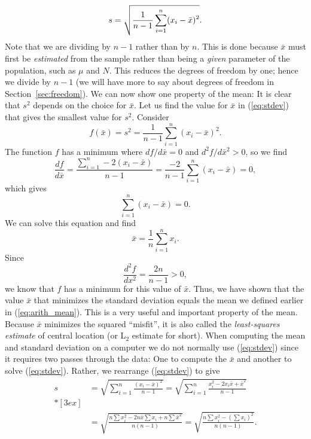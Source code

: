 \begin{equation}
	\index{Sample!variance}
s = \sqrt{ \frac{1}{n-1} \displaystyle \sum^n_{i=1} (x_i - \bar{x}) ^2}.
\label{eq:stdev}
\end{equation}
Note that we are dividing by $n - 1$ rather than by $n$.  This is done because $\bar{x}$  must first be \emph{estimated} from the 
sample rather than being a \emph{given} parameter of the population, such as $\mu$ and $N$.  This reduces the degrees 
of freedom by one; hence we divide by $n - 1$ (we will have more to say about degrees of freedom in Section~\ref{sec:freedom}).
	We can now show one property of the mean:  It is clear that $s^2$ depends on the choice for $\bar{x}$.  
Let us find the value for $\bar{x}$   in (\ref{eq:stdev}) that gives the smallest value for $s^2$.  Consider
\begin{equation}
f(\bar{x}) = s^2 = \frac{1}{n-1} \sum^n_{i=1} (x_i - \bar{x})^2.
\end{equation}
The function $f$ has a minimum where $df/d\bar{x}= 0$  and $d^2f/d\bar{x}^2 > 0$, so we find
\begin{equation}
\frac{df}{d\bar{x}} = \displaystyle \frac{\displaystyle  \sum ^n_{i=1} - 2 (x_i - \bar{x})} {n-1} =
\frac{-2}{n-1} \sum ^n _{i=1} (x_i - \bar{x}) =  0,
\end{equation}	 
which gives
\begin{equation}
\sum^n_{i=1} (x_i - \bar{x}) = 0.
\end{equation}	 
We can solve this equation and find
\begin{equation}
\bar{x} = \frac{1}{n} \sum^n _{i=1} x_i.
\end{equation}	 
Since
\begin{equation}
\frac{d^2f}{dx^2} = \frac{2n}{n-1} > 0,
\end{equation} 
we know that $f$ has a minimum for this value of $\bar{x}$.  Thus, we have shown that the value $\bar{x}$
that minimizes the standard deviation equals 
the mean we defined earlier in (\ref{eq:arith_mean}).  This is a very useful and important property of the mean. 
Because $\bar{x}$ 
minimizes the squared ``misfit'', it is also called the \emph{least-squares estimate} of central location 
(or L$_2$ estimate for short).  When computing the mean and standard deviation on a computer we 
do not normally use (\ref{eq:stdev}) since it requires two passes through the data: One to compute the $\bar{x}$ and 
another to solve (\ref{eq:stdev}).  Rather, we rearrange (\ref{eq:stdev}) to give
\begin{equation}
\begin{array}{ll}
s & = \displaystyle \sqrt{ \sum^n _{i=1} \frac{(x_i - \bar{x})^2} {n-1} } =
\sqrt{ \sum^n_{i=1} \frac{x^2_i - 2x_i \bar{x} + \bar{x}^2} {n-1} }\\*[3ex] \\ 
 \ & = \displaystyle \sqrt{\frac{n \displaystyle \sum x^2_i - 2 n \bar{x} \displaystyle \sum x_i + n \sum \bar{x}^2}
{n(n-1)} } = \sqrt{\frac{n \displaystyle \sum x^2_i - (\sum x_i)^2}{n(n-1)} }.
\end{array}
\end{equation}


